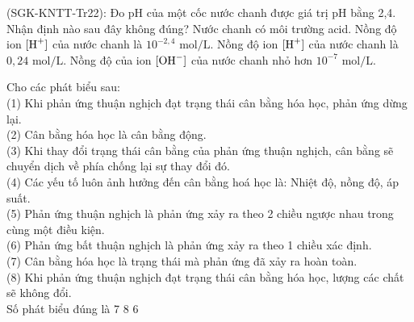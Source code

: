 \documentclass[12pt,a4paper]{article}
\begin{document}
\begin{ex}
(SGK-KNTT-Tr22): Đo pH của một cốc nước chanh được giá trị pH bằng 2,4. Nhận định nào sau đây không đúng?
\choice
{Nước chanh có môi trường acid.}
{Nồng độ ion $[\ce{H+}]$ của nước chanh là $10^{-2{,}4}\text{ mol/L}$.}
{\True Nồng độ ion $[\ce{H+}]$ của nước chanh là $0{,}24\text{ mol/L}$.}
{Nồng độ của ion $[\ce{OH-}]$ của nước chanh nhỏ hơn $10^{-7}\text{ mol/L}$.}
\end{ex}

\begin{ex}
Cho các phát biểu sau:\\
(1) Khi phản ứng thuận nghịch đạt trạng thái cân bằng hóa học, phản ứng dừng lại.\\
(2) Cân bằng hóa học là cân bằng động.\\
(3) Khi thay đổi trạng thái cân bằng của phản ứng thuận nghịch, cân bằng sẽ chuyển dịch về phía chống lại sự thay đổi đó.\\
(4) Các yếu tố luôn ảnh hưởng đến cân bằng hoá học là: Nhiệt độ, nồng độ, áp suất.\\
(5) Phản ứng thuận nghịch là phản ứng xảy ra theo 2 chiều ngược nhau trong cùng một điều kiện.\\
(6) Phản ứng bất thuận nghịch là phản ứng xảy ra theo 1 chiều xác định.\\
(7) Cân bằng hóa học là trạng thái mà phản ứng đã xảy ra hoàn toàn.\\
(8) Khi phản ứng thuận nghịch đạt trạng thái cân bằng hóa học, lượng các chất sẽ không đổi.\\
Số phát biểu đúng là
\choice
{7}
{8}
{6}
{}
\end{ex}
\end{document}
